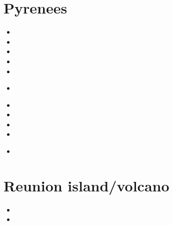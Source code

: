 \section{Pyrenees} 

\begin{small}
\begin{itemize}
\item[\nineteenninetyone]   
\item[\nineteenninetytwo]   
\item[\nineteenninetythree] 
\item[\nineteenninetyeight]
\item[\twothousand]         
\item[\twothousandfour] 
  \\
\item[\twothousandten] 
\item[\twothousandtwelve] 
\item[\twothousandthirteen] 
\item[\twothousandfourteen] 
\item[\twothousandnineteen] 
  \\
\end{itemize}
\end{small}



\section{Reunion island/volcano}

\begin{small}
\begin{itemize}
\item[\twothousandseventeen]
\item[\twothousandtwentytwo]
\end{itemize}
\end{small}


